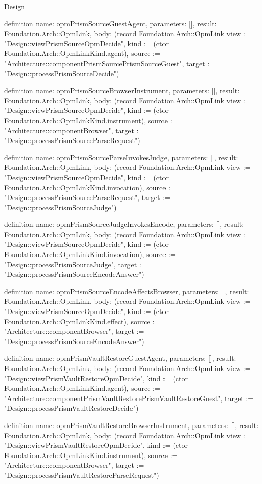 \begin{lexlean}{Design}
\begin{semanticmodule}
definition{
  name: opmPrismSourceGuestAgent,
  parameters: [],
  result: Foundation.Arch::OpmLink,
  body: (record Foundation.Arch::OpmLink {view := "Design::viewPrismSourceOpmDecide", kind := (ctor Foundation.Arch::OpmLinkKind.agent), source := "Architecture::componentPrismSourcePrismSourceGuest", target := "Design::processPrismSourceDecide"})
}

definition{
  name: opmPrismSourceBrowserInstrument,
  parameters: [],
  result: Foundation.Arch::OpmLink,
  body: (record Foundation.Arch::OpmLink {view := "Design::viewPrismSourceOpmDecide", kind := (ctor Foundation.Arch::OpmLinkKind.instrument), source := "Architecture::componentBrowser", target := "Design::processPrismSourceParseRequest"})
}

definition{
  name: opmPrismSourceParseInvokesJudge,
  parameters: [],
  result: Foundation.Arch::OpmLink,
  body: (record Foundation.Arch::OpmLink {view := "Design::viewPrismSourceOpmDecide", kind := (ctor Foundation.Arch::OpmLinkKind.invocation), source := "Design::processPrismSourceParseRequest", target := "Design::processPrismSourceJudge"})
}

definition{
  name: opmPrismSourceJudgeInvokesEncode,
  parameters: [],
  result: Foundation.Arch::OpmLink,
  body: (record Foundation.Arch::OpmLink {view := "Design::viewPrismSourceOpmDecide", kind := (ctor Foundation.Arch::OpmLinkKind.invocation), source := "Design::processPrismSourceJudge", target := "Design::processPrismSourceEncodeAnswer"})
}

definition{
  name: opmPrismSourceEncodeAffectsBrowser,
  parameters: [],
  result: Foundation.Arch::OpmLink,
  body: (record Foundation.Arch::OpmLink {view := "Design::viewPrismSourceOpmDecide", kind := (ctor Foundation.Arch::OpmLinkKind.effect), source := "Architecture::componentBrowser", target := "Design::processPrismSourceEncodeAnswer"})
}

definition{
  name: opmPrismVaultRestoreGuestAgent,
  parameters: [],
  result: Foundation.Arch::OpmLink,
  body: (record Foundation.Arch::OpmLink {view := "Design::viewPrismVaultRestoreOpmDecide", kind := (ctor Foundation.Arch::OpmLinkKind.agent), source := "Architecture::componentPrismVaultRestorePrismVaultRestoreGuest", target := "Design::processPrismVaultRestoreDecide"})
}

definition{
  name: opmPrismVaultRestoreBrowserInstrument,
  parameters: [],
  result: Foundation.Arch::OpmLink,
  body: (record Foundation.Arch::OpmLink {view := "Design::viewPrismVaultRestoreOpmDecide", kind := (ctor Foundation.Arch::OpmLinkKind.instrument), source := "Architecture::componentBrowser", target := "Design::processPrismVaultRestoreParseRequest"})
}


\end{semanticmodule}
\end{lexlean}
